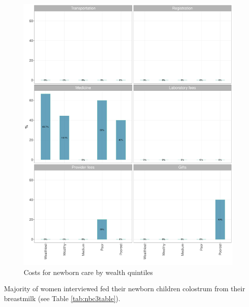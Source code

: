 \documentclass[12pt,a4paper]{article}
\begin{document}
\begin{figure}[H]

{\centering \includegraphics{kayinReport_files/figure-latex/nbc6Plot-1} 

}

\caption{Costs for newborn care by wealth quintiles}\label{fig:nbc6Plot}
\end{figure}

Majority of women interviewed fed their newborn children colostrum from their breastmilk (see Table \ref{tab:nbc3table}).
\end{document}
